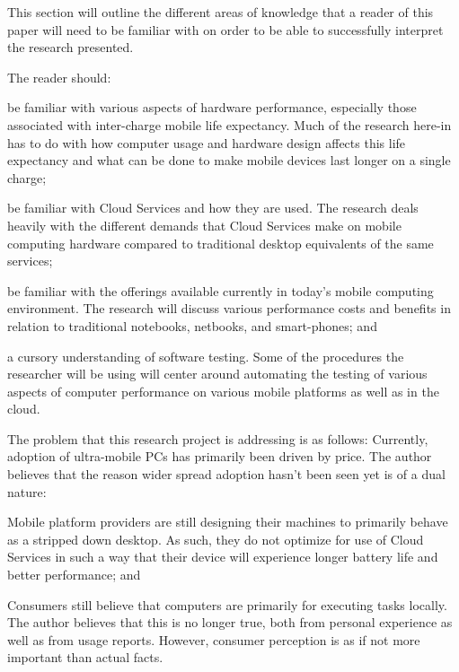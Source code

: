 This section will outline the different areas of knowledge that a reader of this
paper will need to be familiar with on order to be able to successfully
interpret the research presented.

The reader should:
\begin{inparaenum}[(1)]
\item be familiar with various aspects of hardware performance, especially those
  associated with inter-charge mobile life expectancy.  Much of the research
  here-in has to do with how computer usage and hardware design affects this
  life expectancy and what can be done to make mobile devices last longer on a
  single charge;
\item be familiar with Cloud Services and how they are used.  The research deals
  heavily with the different demands that Cloud Services make on mobile
  computing hardware compared to traditional desktop equivalents of the same
  services;
\item be familiar with the offerings available currently in today's mobile
  computing environment.  The research will discuss various performance costs
  and benefits in relation to traditional notebooks, netbooks, and smart-phones;
  and
\item a cursory understanding of software testing.  Some of the procedures the
  researcher will be using will center around automating the testing of various
  aspects of computer performance on various mobile platforms as well as in the
  cloud.
\end{inparaenum}

The problem that this research project is addressing is as follows: Currently,
adoption of ultra-mobile PCs has primarily been driven by price.  The author
believes that the reason wider spread adoption hasn't been seen yet is of a dual
nature:
\begin{inparaenum}[(1)]
\item Mobile platform providers are still designing their machines to primarily
  behave as a stripped down desktop.  As such, they do not optimize for use of
  Cloud Services in such a way that their device will experience longer battery
  life and better performance; and
\item Consumers still believe that computers are primarily for executing tasks
  locally.  The author believes that this is no longer true, both from personal
  experience as well as from usage reports.  However, consumer perception is as
  if not more important than actual facts.
\end{inparaenum}

